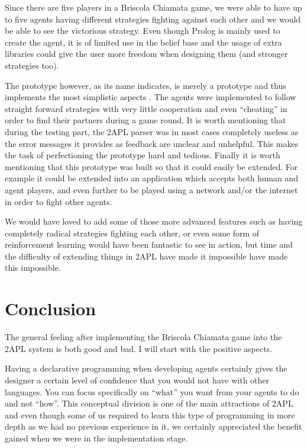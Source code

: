 \documentclass[a4paper]{article}
\begin{document}
Since there are five players in a Briscola Chiamata game, we were able to have up to five agents having different strategies fighting against each other and we would be able to see the victorious strategy. Even though Prolog is mainly used to create the agent, it is of limited use in the belief base and the usage of extra libraries could give the user more freedom when designing them (and  stronger strategies too).

The prototype however, as its name indicates, is merely a prototype and thus implements the most simplistic aspects . The agents were implemented to follow straight forward strategies with very little cooperation and even ``cheating'' in order to find their partners during a game round. It is worth mentioning that during the testing part, the 2APL parser was in most cases completely useless as the error messages it provides as feedback are unclear and unhelpful. This makes the task of perfectioning the prototype hard and tedious. Finally it is worth mentioning that this prototype was built so that it could easily be extended. For example it could be extended into an application which accepts both human and agent players, and even further to be played using a network and/or the internet in order to fight other agents.

We would have loved to add some of those more advanced features such as having completely radical strategies fighting each other, or even some form of reinforcement learning would have been fantastic to see in action, but time and the difficulty of extending things in 2APL have made it impossible have made this impossible.

\section{Conclusion}\label{sec:concl} 

The general feeling after implementing the Briscola Chiamata game into the 2APL system is both good and bad. I will start with the positive aspects.

Having a declarative programming when developing agents certainly gives the designer a certain level of confidence that you would not have with other languages. You can focus specifically on ``what'' you want from your agents to do and not ``how''. This conceptual division is one of the main attractions of 2APL and even though some of us required to learn this type of programming in more depth as we had no previous experience in it, we certainly appreciated the benefit gained when we were in the implementation stage.
\end{document}
